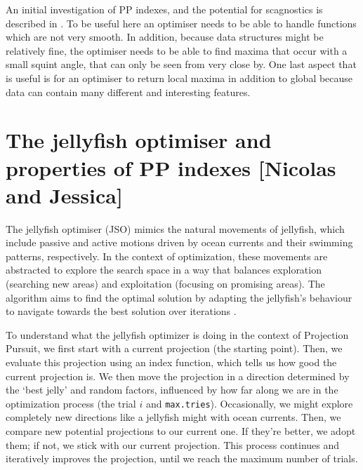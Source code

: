 \documentclass[
  number,
  preprint,
  3p]{elsarticle}
\begin{document}
An initial investigation of PP indexes, and the potential for
scagnostics is described in \citet{laa_using_2020}. To be useful here an
optimiser needs to be able to handle functions which are not very
smooth. In addition, because data structures might be relatively fine,
the optimiser needs to be able to find maxima that occur with a small
squint angle, that can only be seen from very close by. One last aspect
that is useful is for an optimiser to return local maxima in addition to
global because data can contain many different and interesting features.

\hypertarget{sec-theory}{%
\section{The jellyfish optimiser and properties of PP indexes {[}Nicolas
and Jessica{]}}\label{sec-theory}}

The jellyfish optimiser (JSO) mimics the natural movements of jellyfish,
which include passive and active motions driven by ocean currents and
their swimming patterns, respectively. In the context of optimization,
these movements are abstracted to explore the search space in a way that
balances exploration (searching new areas) and exploitation (focusing on
promising areas). The algorithm aims to find the optimal solution by
adapting the jellyfish's behaviour to navigate towards the best solution
over iterations \citep{chou_novel_2021}.

To understand what the jellyfish optimizer is doing in the context of
Projection Pursuit, we first start with a current projection (the
starting point). Then, we evaluate this projection using an index
function, which tells us how good the current projection is. We then
move the projection in a direction determined by the `best jelly' and
random factors, influenced by how far along we are in the optimization
process (the trial \(i\) and \texttt{max.tries}). Occasionally, we might
explore completely new directions like a jellyfish might with ocean
currents. Then, we compare new potential projections to our current one.
If they're better, we adopt them; if not, we stick with our current
projection. This process continues and iteratively improves the
projection, until we reach the maximum number of trials.
\end{document}
